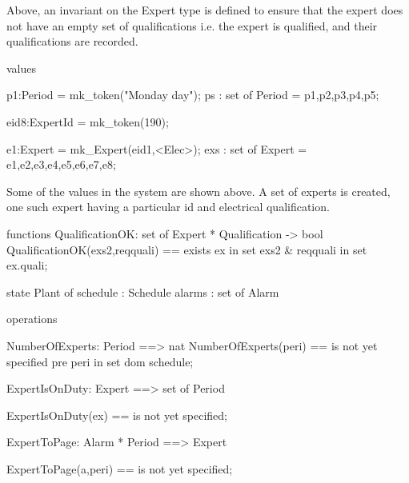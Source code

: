 Above, an invariant on the Expert type is defined to ensure that the expert does not have an empty set of qualifications i.e. the expert is qualified, and their qualifications are recorded.

\begin{vdmsl}[label=lst:AlarmSL.vdmsl,caption=Alarm system's values in VDM-SL]
values
 
  p1:Period = mk_token("Monday day");
  ps : set of Period = {p1,p2,p3,p4,p5};

  eid8:ExpertId = mk_token(190);
  
  e1:Expert = mk_Expert(eid1,{<Elec>});
  exs : set of Expert = {e1,e2,e3,e4,e5,e6,e7,e8};
\end{vdmsl}

Some of the values in the system are shown above. A set of experts is created, one such expert having a particular id and electrical qualification.

\begin{vdmsl}[label=lst:AlarmSL.vdmsl,caption=An alarm system function in VDM-SL which takes a set of experts\, a qualification and returns a boolean value.]
functions
  QualificationOK: set of Expert * Qualification -> bool
  QualificationOK(exs2,reqquali) ==
    exists ex in set exs2 & reqquali in set ex.quali;
\end{vdmsl}
\hfill\break
\hfill\break
\begin{vdmsl}[label=lst:AlarmSL.vdmsl,caption=Alarm system's persistent state in VDM-SL\, t he state is represented as a record type with the important persistent data as fields\, here schedule and alarms.]
state Plant of
schedule : Schedule
alarms : set of Alarm

\end{vdmsl}

\begin{vdmsl}[label=lst:AlarmSL.vdmsl,caption=Operations on the state of the alarm system in VDM-SL\, operations manipulate data stored in the persistent state and mimic the operation of the system.]
operations

NumberOfExperts: Period ==> nat
NumberOfExperts(peri) == is not yet specified
pre peri in set dom schedule;

ExpertIsOnDuty: Expert ==> set of Period

ExpertIsOnDuty(ex) == is not yet specified;

ExpertToPage: Alarm * Period ==> Expert

ExpertToPage(a,peri) == is not yet specified;
\end{vdmsl}

